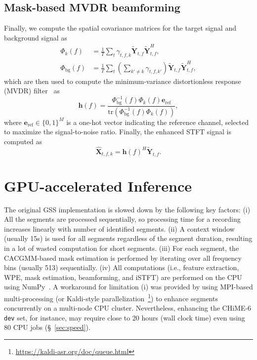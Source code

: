 \documentclass[a4paper]{article}
\begin{document}
\subsection{Mask-based MVDR beamforming}
\label{sec:mvdr}

Finally, we compute the spatial covariance matrices for the target signal and background signal as
\begin{align}
\Phi_k(f) &= \frac{1}{T}\sum_t \gamma_{t,f,k} \tilde{\mathbf{Y}}_{t,f} \tilde{\mathbf{Y}}_{t,f}^H,\\
\Phi_{\mathrm{bg}}(f) &= \frac{1}{T}\sum_t \left(\sum_{k' \neq k}\gamma_{t,f,k'}\right) \tilde{\mathbf{Y}}_{t,f} \tilde{\mathbf{Y}}_{t,f}^H,
\end{align}
which are then used to compute the minimum-variance distortionless response (MVDR) filter~\cite{Souden2010OnOF,Erdogan2016ImprovedMB} as
\begin{equation}
    \mathbf{h}(f) = \frac{\Phi_\mathrm{bg}^{-1}(f)\Phi_k(f)\mathbf{e}_{\mathrm{ref}}}{\mathrm{tr}\left(\Phi_\mathrm{bg}^{-1}(f)\Phi_k(f)\right)},
\end{equation}
where $\mathbf{e}_{\mathrm{ref}}\in\{0,1\}^M$ is a one-hot vector indicating the reference channel, selected to maximize the signal-to-noise ratio. Finally, the enhanced STFT signal is computed as
\begin{equation}
    \widehat{\mathbf{X}}_{t,f,k} = \mathbf{h}(f)^H \tilde{\mathbf{Y}}_{t,f}.
\end{equation}

\section{GPU-accelerated Inference}
\label{sec:method}



The original GSS implementation is slowed down by the following key factors: (i) All the segments are processed sequentially, so processing time for a recording increases linearly with number of identified segments. (ii) A context window (usually 15s) is used for all segments regardless of the segment duration, resulting in a lot of wasted computation for short segments. (iii) For each segment, the CACGMM-based mask estimation is performed by iterating over all frequency bins (usually 513) sequentially. (iv) All computations (i.e., feature extraction, WPE, mask estimation, beamforming, and iSTFT) are performed on the CPU using NumPy~\cite{Harris2020ArrayPW}. A workaround for limitation (i) was provided by using MPI-based multi-processing (or Kaldi-style parallelization~\footnote{\url{https://kaldi-asr.org/doc/queue.html}}) to enhance segments concurrently on a multi-node CPU cluster. Nevertheless, enhancing the CHiME-6 \texttt{dev} set, for instance, may require close to 20 hours (wall clock time) even using 80 CPU jobs (\S~\ref{sec:speed}).  
\end{document}
